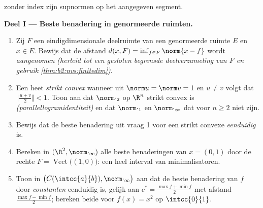 \begin{problem}
\label{pb:b2:nvs:1}
 zonder index zijn supnormen op het aangegeven segment.

\medskip
\noindent\textbf{Deel I --- Beste benadering in genormeerde
ruimten.}
\begin{enumerate}
  \item Zij $F$ een eindigdimensionale deelruimte van een
        genormeerde ruimte $E$ en $x \in E$. Bewijs dat de afstand
        $d(x, F) = \inf_{f \in F}\norm{x - f}$ wordt
        \emph{aangenomen} \emph{(herleid tot een gesloten
        begrensde deelverzameling van $F$ en gebruik
        \cref{thm:b2:nvs:finitedim})}.
  \item Een  heet \emph{strikt convex} wanneer uit $\norm u =
        \norm v = 1$ en $u \neq v$ volgt dat
        $\bigl\Vert\frac{u + v}2\bigr\Vert < 1$. Toon aan dat
        $\norm\cdot_2$ op $\R^n$ strikt convex is
        \emph{(parallellogramidentiteit)} en dat
        $\norm\cdot_1$ en $\norm\cdot_\infty$ dat voor $n \geq 2$
        niet zijn.
  \item Bewijs dat de beste benadering uit vraag 1 voor een strikt
        convexe  \emph{eenduidig} is.
  \item Bereken in $(\R^2, \norm\cdot_\infty)$ alle beste
        benaderingen van $x = (0, 1)$ door de rechte $F =
        \operatorname{Vect}\bigl((1,0)\bigr)$: een heel interval
        van minimalisatoren.
  \item Toon in $\bigl(C(\intcc{a}{b}), \norm\cdot_\infty\bigr)$
        aan dat de beste benadering van $f$ door \emph{constanten}
        eenduidig is, gelijk aan $c^* = \frac{\max f + \min f}{2}$
        met afstand $\frac{\max f - \min f}{2}$; bereken beide
        voor $f(x) = x^2$ op $\intcc{0}{1}$.
\end{enumerate}


\end{problem}
